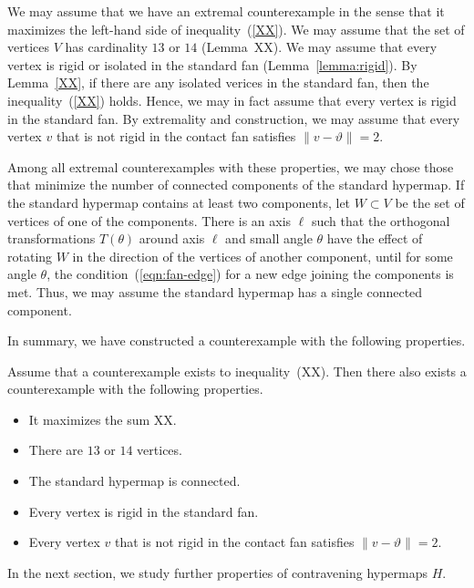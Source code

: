 We may assume that we have an extremal counterexample
in the sense that it maximizes the left-hand side of inequality~(\ref{XX}).  We may assume that the set of vertices $V$ has cardinality $13$ or $14$ (Lemma~{XX}).
We may assume that every vertex is rigid or isolated in
the standard fan (Lemma~\ref{lemma:rigid}).  By Lemma~\ref{XX}, if there are any isolated verices in the standard fan, then the inequality~(\ref{XX}) holds.  Hence, we may in fact assume that every vertex is rigid in the standard fan.
By extremality and construction, we may assume that every vertex $v$ that is not rigid in the contact fan satisfies $\|v-\vartheta\|=2$.

Among all extremal counterexamples with these properties,
we may chose those that minimize the number of connected components
of the standard hypermap.
If the standard hypermap contains at least two components, let $W\subset V$ be the set of vertices of one of the components.  There is an axis $\ell$ such that the orthogonal transformations $T(\theta)$ around axis $\ell$ and small angle $\theta$  have the effect of rotating $W$ in the direction of the vertices of another component, until for some angle $\theta$, the condition~(\ref{eqn:fan-edge}) for
a new edge joining the components is met.  Thus, we may assume the standard hypermap has a single connected component.

In summary, we have constructed a counterexample with the following properties.

\begin{lemma} Assume that a counterexample exists to inequality~(XX).  Then there also exists a counterexample with the following properties.
\begin{itemize}
\item It maximizes the sum XX.
\item There are $13$ or $14$ vertices.
\item The standard hypermap is connected.
\item Every vertex is rigid in the standard fan.
\item Every vertex $v$ that is not rigid in the contact
fan satisfies $\|v-\vartheta\|=2$.
\end{itemize}
\end{lemma}







In the next section, we study further properties of contravening hypermaps $H$.





